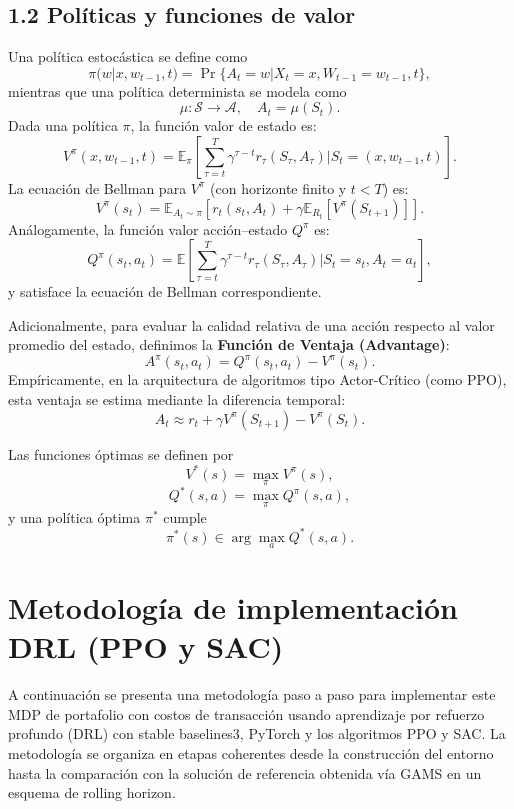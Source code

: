 \documentclass[12pt]{article}
\begin{document}
\subsection*{1.2 Políticas y funciones de valor}
Una política estocástica se define como
$$\pi(w | x, w_{t-1}, t) = \Pr\{A_t = w | X_t = x, W_{t-1} = w_{t-1}, t\},$$
mientras que una política determinista se modela como
$$\mu : \mathcal{S} \to \mathcal{A}, \quad A_t = \mu(S_t).$$
Dada una política $\pi$, la función valor de estado es:
$$V^\pi(x, w_{t-1}, t) = \mathbb{E}_\pi \left[ \sum_{\tau=t}^T \gamma^{\tau-t} r_\tau(S_\tau, A_\tau) \Big| S_t = (x, w_{t-1}, t) \right].$$
La ecuación de Bellman para $V^\pi$ (con horizonte finito y $t < T$) es:
$$V^\pi(s_t) = \mathbb{E}_{A_t \sim \pi} \left[ r_t(s_t, A_t) + \gamma \mathbb{E}_{R_t} [V^\pi(S_{t+1})] \right].$$
Análogamente, la función valor acción--estado $Q^\pi$ es:
$$Q^\pi(s_t, a_t) = \mathbb{E} \left[ \sum_{\tau=t}^T \gamma^{\tau-t} r_\tau(S_\tau, A_\tau) \Big| S_t = s_t, A_t = a_t \right],$$
y satisface la ecuación de Bellman correspondiente.

Adicionalmente, para evaluar la calidad relativa de una acción respecto al valor promedio del estado, definimos la \textbf{Función de Ventaja (Advantage)}:
$$A^\pi(s_t, a_t) = Q^\pi(s_t, a_t) - V^\pi(s_t).$$
Empíricamente, en la arquitectura de algoritmos tipo Actor-Crítico (como PPO), esta ventaja se estima mediante la diferencia temporal:
$$A_t \approx r_t + \gamma V^\pi(S_{t+1}) - V^\pi(S_t).$$

Las funciones óptimas se definen por
$$V^*(s) = \max_\pi V^\pi(s),$$
$$Q^*(s, a) = \max_\pi Q^\pi(s, a),$$
y una política óptima $\pi^*$ cumple
$$\pi^*(s) \in \arg\max_a Q^*(s, a).$$

\section{Metodología de implementación DRL (PPO y SAC)}
A continuación se presenta una metodología paso a paso para implementar este MDP de portafolio con costos de transacción usando aprendizaje por refuerzo profundo (DRL) con stable baselines3, PyTorch y los algoritmos PPO y SAC. La metodología se organiza en etapas coherentes desde la construcción del entorno hasta la comparación con la solución de referencia obtenida vía GAMS en un esquema de rolling horizon.
\end{document}
